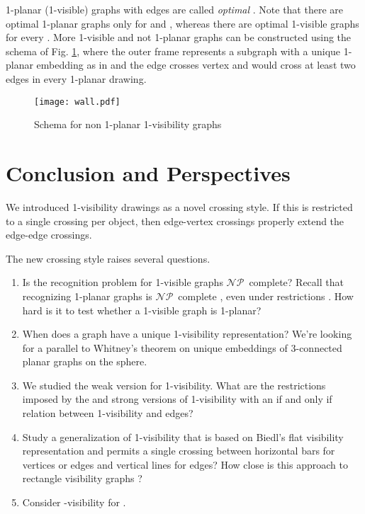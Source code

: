 \documentclass[runningheads]{llncs}
\newcommand{\NP}{\ensuremath{\mathcal{NP}}}
\begin{document}
1-planar (1-visible) graphs with    edges  are  called
\emph{optimal} \cite{bhw-1og-84,s-rm1pg-10}. Note that there are
optimal 1-planar graphs only for  and 
\cite{bhw-1og-84,s-rm1pg-10}, whereas there are optimal 1-visible
graphs for every . More 1-visible and not 1-planar graphs
can be constructed using the schema of Fig. \ref{fig:wall}, where
the outer frame represents a subgraph with a unique 1-planar
embedding as in \cite{km-mo1ih-13} and the edge  crosses
vertex  and would cross at least two edges in every 1-planar
drawing.

\begin{figure}
   \begin{center}
   \texttt{[image: wall.pdf]}
     \caption{Schema  for non 1-planar 1-visibility graphs}
     \label{fig:wall}
   \end{center}
\end{figure}


\section{Conclusion and Perspectives}

We introduced 1-visibility drawings as a novel crossing style. If
this is restricted to a single crossing per object, then edge-vertex
crossings properly extend the edge-edge crossings.

The new crossing style raises several questions.
\begin{enumerate}
  \item Is the recognition problem for 1-visible graphs \NP \, complete?
  Recall that recognizing 1-planar graphs is \NP \, complete
  \cite{km-mo1ih-13}, even under restrictions
  \cite{abgr-o1pgr-12,km-mo1ih-13}. How hard is it to test
  whether a 1-visible graph is 1-planar?
  \item When does a graph have a unique 1-visibility representation?
  We're looking for a parallel to Whitney's theorem on unique
  embeddings of 3-connected planar graphs on the sphere.
  \item We studied the weak version for 1-visibility. What are the
  restrictions imposed by the  and strong versions of
  1-visibility with an if and only if relation between
  1-visibility and edges?
  \item Study a generalization of 1-visibility that is based on Biedl's flat visibility
  representation and permits a single  crossing between
  horizontal bars for vertices or edges and vertical lines for
  edges? How close is this approach to rectangle visibility
  graphs \cite{dh-rvrbg-94,hsv-orstt-95,hsv-rstg-99}?
  \item Consider -visibility for .
\end{enumerate}
\end{document}
